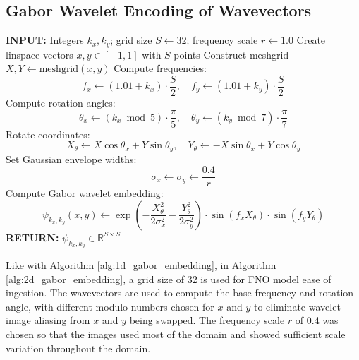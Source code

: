 \documentclass[preprint,review,12pt]{elsarticle}
\begin{document}
\subsection{Gabor Wavelet Encoding of Wavevectors}
\begin{algorithm}[H]
\caption{2D Gabor Wavelet Embedding for Wavevectors}
\label{alg:2d_gabor_embedding}
\begin{algorithmic}[1]
\STATE \textbf{INPUT:} Integers \( k_x, k_y \); grid size \( S \leftarrow 32 \); frequency scale \( r \leftarrow 1.0 \)
\STATE Create linspace vectors \( x, y \in [-1, 1] \) with \( S \) points
\STATE Construct meshgrid \( X, Y \leftarrow \text{meshgrid}(x, y) \)
\STATE Compute frequencies:
\[
f_x \leftarrow (1.01 + k_x) \cdot \frac{S}{2}, \quad f_y \leftarrow (1.01 + k_y) \cdot \frac{S}{2}
\]
\STATE Compute rotation angles:
\[
\theta_x \leftarrow (k_x \bmod 5) \cdot \frac{\pi}{5}, \quad \theta_y \leftarrow (k_y \bmod 7) \cdot \frac{\pi}{7}
\]
\STATE Rotate coordinates:
\[
X_\theta \leftarrow X \cos \theta_x + Y \sin \theta_y, \quad
Y_\theta \leftarrow -X \sin \theta_x + Y \cos \theta_y
\]
\STATE Set Gaussian envelope widths:
\[
\sigma_x \leftarrow \sigma_y \leftarrow \frac{0.4}{r}
\]
\STATE Compute Gabor wavelet embedding:
\[
\psi_{k_x, k_y}(x, y) \leftarrow
\exp\left(-\frac{X_\theta^2}{2 \sigma_x^2} - \frac{Y_\theta^2}{2 \sigma_y^2}\right)
\cdot \sin(f_x X_\theta) \cdot \sin(f_y Y_\theta)
\]
\STATE \textbf{RETURN:} \( \psi_{k_x, k_y} \in \mathbb{R}^{S \times S} \)
\end{algorithmic}
\end{algorithm}

Like with Algorithm \ref{alg:1d_gabor_embedding}, in Algorithm \ref{alg:2d_gabor_embedding}, a grid size of 32 is used for FNO model ease of ingestion. The wavevectors are used to compute the base frequency and rotation angle, with different modulo numbers chosen for $x$ and $y$ to eliminate wavelet image aliasing from $x$ and $y$ being swapped. The frequency scale $r$ of 0.4 was chosen so that the images used most of the domain and showed sufficient scale variation throughout the domain.
\end{document}
